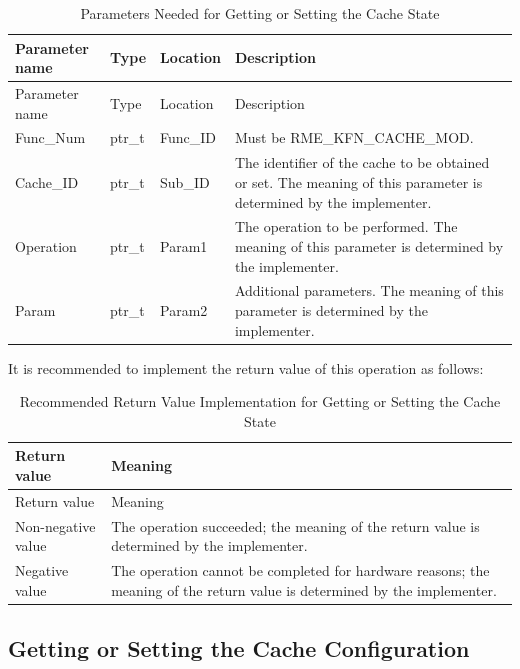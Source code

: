 \begin{xltabular}{\textwidth}{@{}>{\hsize\raggedright\arraybackslash}X>{\hsize\raggedright\arraybackslash}X>{\hsize\raggedright\arraybackslash}X>{\hsize\raggedright\arraybackslash}X@{}}
\caption{Parameters Needed for Getting or Setting the Cache State}\label{tab:8-25-get-or-set-cache-state-parameters}\\
\toprule
Parameter name & Type & Location & Description\tabularnewline
\endfirsthead
\toprule
Parameter name & Type & Location & Description\tabularnewline
\midrule
\endhead
\bottomrule
\endlastfoot
Func\_Num & ptr\_t & Func\_ID & Must be RME\_KFN\_CACHE\_MOD.\tabularnewline
Cache\_ID & ptr\_t & Sub\_ID &
The identifier of the cache to be obtained or set. The meaning of this parameter is determined by the implementer.\tabularnewline
Operation & ptr\_t & Param1 &
The operation to be performed. The meaning of this parameter is determined by the implementer.\tabularnewline
Param & ptr\_t & Param2 &
Additional parameters. The meaning of this parameter is determined by the implementer.\tabularnewline
\end{xltabular}
\nopagebreak[4]

It is recommended to implement the return value of this operation as follows:

\begin{xltabular}{\textwidth}{@{}>{\hsize\raggedright\arraybackslash}X>{\hsize\raggedright\arraybackslash}X@{}}
\caption{Recommended Return Value Implementation for Getting or Setting the Cache State}\label{tab:8-26-get-or-set-cache-state-suggested-return-values}\\
\toprule
Return value & Meaning\tabularnewline
\endfirsthead
\toprule
Return value & Meaning\tabularnewline
\midrule
\endhead
\bottomrule
\endlastfoot
    Non-negative value & The operation succeeded; the meaning of the return value is determined by the implementer.\tabularnewline
    Negative value & The operation cannot be completed for hardware reasons; the meaning of the return value is determined by the implementer.\tabularnewline
\end{xltabular}
\nopagebreak[4]

\subsection{Getting or Setting the Cache Configuration}\label{subsec:8-get-or-set-cache-configuration}

